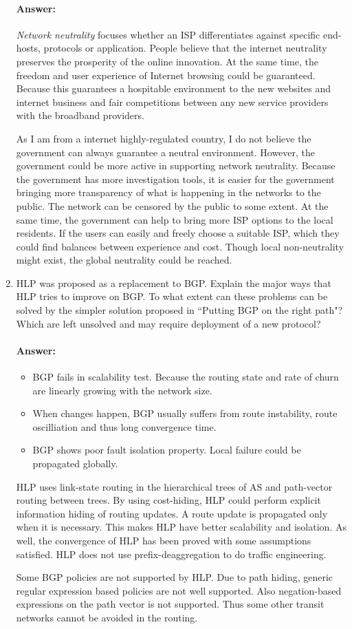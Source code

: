 \documentclass[a4paper,11pt]{article}
\theoremstyle{mytheor}
\begin{document}
\begin{enumerate}
\paragraph{Answer:}
\emph{Network neutrality} focuses whether an ISP differentiates against specific end-hosts, protocols or application.
People believe that the internet neutrality preserves the prosperity of the online innovation.
At the same time, the freedom and user experience of Internet browsing could be guaranteed. 
Because this guarantees a hospitable environment to the new websites and internet business and fair competitions between any new service providers with the broadband providers.

As I am from a internet highly-regulated country, I do not believe the government can always guarantee a neutral environment.
However, the government could be more active in supporting network neutrality.
Because the government has more investigation tools, it is easier for the government bringing more transparency of what is happening in the networks to the public.
The network can be censored by the public to some extent.
At the same time, the government can help to bring more ISP options to the local residents.
If the users can easily and freely choose a suitable ISP, which they could find balances between experience and cost.
Though local non-neutrality might exist, the global neutrality could be reached.

\item
HLP was proposed as a replacement to BGP. 
Explain the major ways that HLP tries to improve on BGP. 
To what extent can these problems can be solved by the simpler solution proposed in ``Putting BGP on the
right path"? 
Which are left unsolved and may require deployment of a new protocol?
\paragraph{Answer:}
\begin{itemize}
\item BGP fails in scalability test. 
Because the routing state and rate of churn are linearly growing with the network size.
\item When changes happen, BGP usually suffers from route instability, route oscilliation and thus long convergence time.
\item BGP shows poor fault isolation property.
Local failure could be propagated globally.
\end{itemize}

HLP uses link-state routing in the hierarchical trees of AS and path-vector routing between trees.
By using cost-hiding, HLP could perform explicit information hiding of routing updates.
A route update is propagated only when it is necessary.
This makes HLP have better scalability and isolation.
As well, the convergence of HLP has been proved with some assumptions satisfied.
HLP does not use prefix-deaggregation to do traffic engineering.

Some BGP policies are not supported by HLP.
Due to path hiding, generic regular expression based policies are not well supported.
Also negation-based expressions on the path vector is not supported. 
Thus some other transit networks cannot be avoided in the routing.

\end{enumerate}
\end{document}
